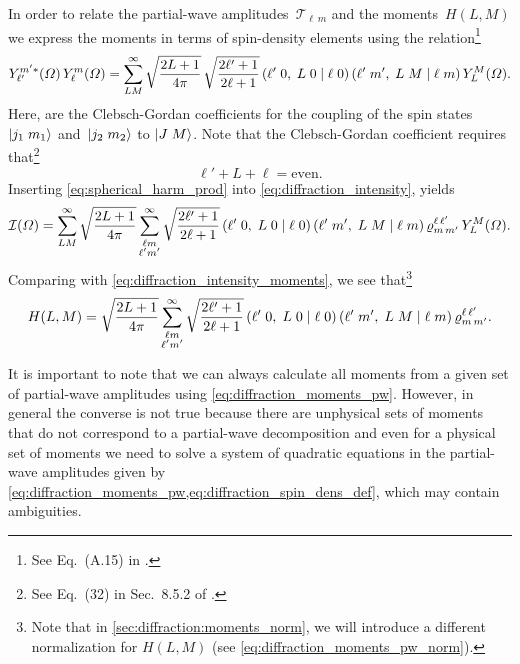 In order to relate the partial-wave amplitudes~$\mathcal{T}_{\ell\,
m}$ and the moments~$H(L, M)$ we express the moments in terms of
spin-density elements using the relation\footnote{See Eq.~(A.15) in
.}
\begin{equation}
  \label{eq:spherical_harm_prod}
  Y_{\ell'}^{m' *}(\Omega)\, Y_{\ell}^m(\Omega)
  = \sum_{L M}^\infty \sqrt{\frac{2 L + 1}{4 \pi}}\, \sqrt{\frac{2 \ell' + 1}{2 \ell + 1}}\, ({\ell'}\;{0},\;{L}\;{0}\; |\; {\ell}\;{0})\, ({\ell'}\;{m'},\;{L}\;{M}\; |\; {\ell}\;{m})\, Y_L^M(\Omega).
\end{equation}
Here,  are the Clebsch-Gordan
coefficients for the coupling of the spin states $\ket{j_1\; m_1}$
and~$\ket{j_2\; m_2}$ to $\ket{J\; M}$.  Note that the Clebsch-Gordan
coefficient  requires
that\footnote{See Eq.~(32) in Sec.~8.5.2 of
.}
\begin{equation}
  \label{eq:ang_mom_sum}
  \ell' + L + \ell
  = \text{even}.
\end{equation}
Inserting \cref{eq:spherical_harm_prod} into
\cref{eq:diffraction_intensity}, yields
\begin{equation}
  \mathcal{I}(\Omega)
  = \sum_{L M}^\infty \sqrt{\frac{2 L + 1}{4 \pi}} \sum_{\substack{\ell m \\ \ell' m'}}^\infty
  \sqrt{\frac{2 \ell' + 1}{2 \ell + 1}}\, ({\ell'}\;{0},\;{L}\;{0}\; |\; {\ell}\;{0})\, ({\ell'}\;{m'},\;{L}\;{M}\; |\; {\ell}\;{m})\,
  \varrho^{\ell\, \ell'}_{m\, m'}\, Y_L^M(\Omega).
\end{equation}
Comparing with \cref{eq:diffraction_intensity_moments}, we see
that\footnote{Note that in \cref{sec:diffraction:moments_norm}, we
will introduce a different normalization for $H(L, M)$ (see
\cref{eq:diffraction_moments_pw_norm}).}
\begin{equation}
  \label{eq:diffraction_moments_pw}
  H(L, M)
  = \sqrt{\frac{2 L + 1}{4 \pi}} \sum_{\substack{\ell m \\ \ell' m'}}^\infty
  \sqrt{\frac{2 \ell' + 1}{2 \ell + 1}}\,
  ({\ell'}\;{0},\;{L}\;{0}\; |\; {\ell}\;{0})\, ({\ell'}\;{m'},\;{L}\;{M}\; |\; {\ell}\;{m})\,
  \varrho^{\ell\, \ell'}_{m\, m'}.
\end{equation}

It is important to note that we can always calculate all moments from
a given set of partial-wave amplitudes using
\cref{eq:diffraction_moments_pw}.  However, in general the converse is
not true because there are unphysical sets of moments that do not
correspond to a partial-wave decomposition and even for a physical set
of moments we need to solve a system of quadratic equations in the
partial-wave amplitudes given by
\cref{eq:diffraction_moments_pw,eq:diffraction_spin_dens_def}, which
may contain ambiguities.

